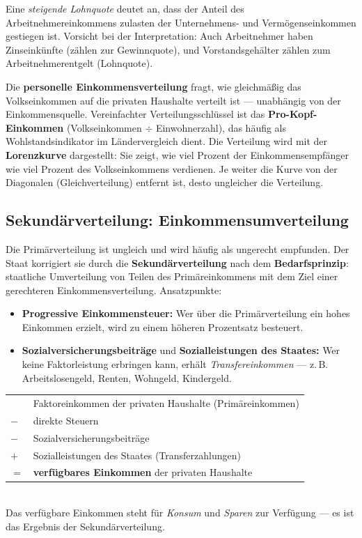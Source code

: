 \documentclass[11pt, a4paper]{article}
\begin{document}
Eine \emph{steigende Lohnquote} deutet an, dass der Anteil des Arbeitnehmereinkommens
zulasten der Unternehmens- und Vermögenseinkommen gestiegen ist. Vorsicht bei der
Interpretation: Auch Arbeitnehmer haben Zinseinkünfte (zählen zur Gewinnquote), und
Vorstandsgehälter zählen zum Arbeitnehmerentgelt (Lohnquote).

Die \textbf{personelle Einkommensverteilung} fragt, wie gleichmäßig das Volkseinkommen
auf die privaten Haushalte verteilt ist --- unabhängig von der Einkommensquelle.
Vereinfachter Verteilungsschlüssel ist das \textbf{Pro-Kopf-Einkommen} (Volkseinkommen
$\div$ Einwohnerzahl), das häufig als Wohlstandsindikator im Ländervergleich dient. Die
Verteilung wird mit der \textbf{Lorenzkurve} dargestellt: Sie zeigt, wie viel Prozent der
Einkommensempfänger wie viel Prozent des Volkseinkommens verdienen. Je weiter die Kurve
von der Diagonalen (Gleichverteilung) entfernt ist, desto ungleicher die Verteilung.

\subsection{Sekundärverteilung: Einkommensumverteilung}

Die Primärverteilung ist ungleich und wird häufig als ungerecht empfunden. Der Staat
korrigiert sie durch die \textbf{Sekundärverteilung} nach dem \textbf{Bedarfsprinzip}:
staatliche Umverteilung von Teilen des Primäreinkommens mit dem Ziel einer gerechteren
Einkommensverteilung. Ansatzpunkte:

\begin{itemize}
  \item \textbf{Progressive Einkommensteuer:} Wer über die Primärverteilung ein hohes
    Einkommen erzielt, wird zu einem höheren Prozentsatz besteuert.
  \item \textbf{Sozialversicherungsbeiträge} und \textbf{Sozialleistungen des Staates:}
    Wer keine Faktorleistung erbringen kann, erhält \emph{Transfereinkommen} --- z.\,B.
    Arbeitslosengeld, Renten, Wohngeld, Kindergeld.
\end{itemize}

\begin{merksatz}[title={\bfseries Formel: Verfügbares Einkommen der privaten Haushalte}]
\begin{tabular}{ll}
  & Faktoreinkommen der privaten Haushalte (Primäreinkommen)\\
$-$ & direkte Steuern\\
$-$ & Sozialversicherungsbeiträge\\
$+$ & Sozialleistungen des Staates (Transferzahlungen)\\
\midrule
$=$ & \textbf{verfügbares Einkommen} der privaten Haushalte
\end{tabular}\\[0.4em]
Das verfügbare Einkommen steht für \emph{Konsum} und \emph{Sparen} zur Verfügung ---
es ist das Ergebnis der Sekundärverteilung.
\end{merksatz}
\end{document}
